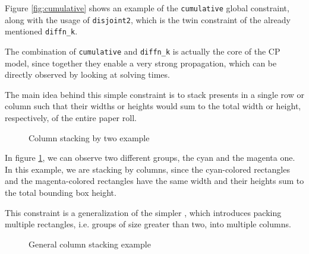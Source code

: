 \documentclass[a4paper,10pt]{article}
\newcounter{subsubsubsection}[subsubsection]
\begin{document}
Figure \ref{fig:cumulative} shows an example of the \texttt{cumulative} global constraint, along with the usage of \texttt{disjoint2}, which is the twin constraint of the already mentioned \texttt{diffn\_k}.

The combination of \texttt{cumulative} and \texttt{diffn\_k} is actually the core of the CP model, since together they enable a very strong propagation, which can be directly observed by looking at solving times.

 \label{sec:stack-two}
The main idea behind this simple constraint is to stack presents in a single row or column such that their widths or heights would sum to the total width or height, respectively, of the entire paper roll.

\begin{figure}[h]
   \centering
   \caption{Column stacking by two example}
   \label{fig:col-stacking-two}
\end{figure}

In figure \ref{fig:col-stacking-two}, we can observe two different groups, the cyan and the magenta one. In this example, we are stacking by columns, since the cyan-colored rectangles and the magenta-colored rectangles have the same width and their heights sum to the total bounding box height.

 \label{sec:column-stacking}
This constraint is a generalization of the simpler , which introduces packing multiple rectangles, i.e. groups of size greater than two, into multiple columns.

\begin{figure}[h]
   \centering
   \caption{General column stacking example}
   \label{fig:col-stacking}
\end{figure}
\end{document}
